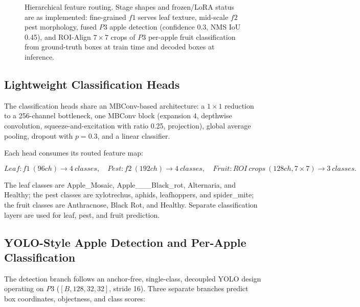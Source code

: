 \documentclass[preprint,12pt]{elsarticle}
\begin{document}
\begin{figure}[H]
\centering
\resizebox{\textwidth}{!}{}
\caption{Hierarchical feature routing. Stage shapes and frozen/LoRA
status are as implemented: fine-grained $f1$ serves leaf texture,
mid-scale $f2$ pest morphology, fused $P3$ apple detection
(confidence 0.3, NMS IoU 0.45), and ROI-Align $7\times7$ crops of $P3$
per-apple fruit classification from ground-truth boxes at train time
and decoded boxes at inference.}
\label{fig:routing}
\end{figure}


\subsection{Lightweight Classification Heads}

The classification heads share an MBConv-based architecture: a
$1\times1$ reduction to a 256-channel bottleneck, one MBConv block
(expansion 4, depthwise convolution, squeeze-and-excitation with ratio
0.25, projection), global average pooling, dropout with $p=0.3$, and a
linear classifier.

Each head consumes its routed feature map:

\begin{equation}
Leaf:f1\ (96ch)\rightarrow 4\ classes,
\quad
Pest:f2\ (192ch)\rightarrow 4\ classes,
\quad
Fruit:ROI\ crops\ (128ch,7\times7)\rightarrow 3\ classes.
\end{equation}

The leaf classes are Apple\_Mosaic, Apple\_\_\_Black\_rot, Alternaria,
and Healthy; the pest classes are xylotrechus, aphids, leafhoppers, and
spider\_mite; the fruit classes are Anthracnose, Black Rot, and
Healthy. Separate classification layers are used for leaf, pest, and
fruit prediction.


\subsection{YOLO-Style Apple Detection and Per-Apple Classification}

The detection branch follows an anchor-free, single-class, decoupled
YOLO design operating on $P3$ ($[B,128,32,32]$, stride 16). Three
separate branches predict box coordinates, objectness, and class
scores:
\end{document}
